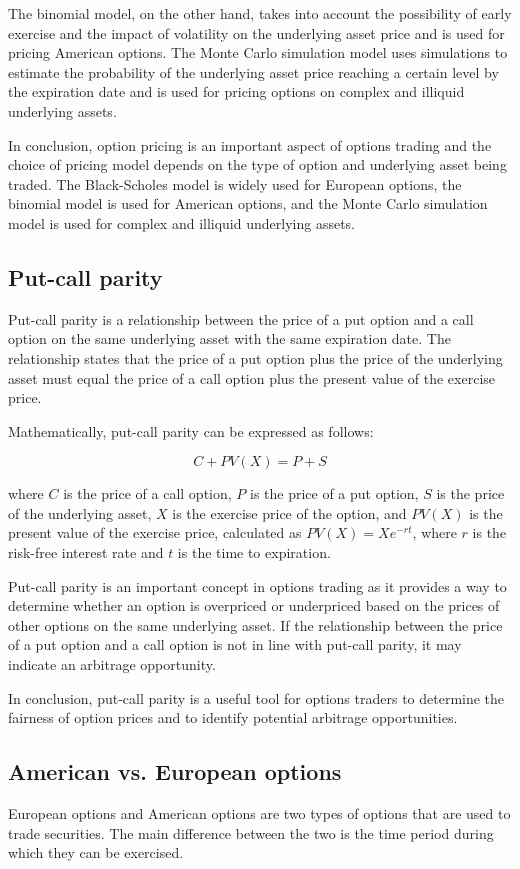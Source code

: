 \documentclass[12pt, a4paper, oneside]{article}
\begin{document}
The binomial model, on the other hand, takes into account the possibility of early exercise and the impact of volatility on the underlying asset price and is used for pricing American options. The Monte Carlo simulation model uses simulations to estimate the probability of the underlying asset price reaching a certain level by the expiration date and is used for pricing options on complex and illiquid underlying assets.

In conclusion, option pricing is an important aspect of options trading and the choice of pricing model depends on the type of option and underlying asset being traded. The Black-Scholes model is widely used for European options, the binomial model is used for American options, and the Monte Carlo simulation model is used for complex and illiquid underlying assets.
\subsection{ Put-call parity }
Put-call parity is a relationship between the price of a put option and a call option on the same underlying asset with the same expiration date. The relationship states that the price of a put option plus the price of the underlying asset must equal the price of a call option plus the present value of the exercise price.

Mathematically, put-call parity can be expressed as follows:

$$C + PV(X) = P + S$$

where $C$ is the price of a call option, $P$ is the price of a put option, $S$ is the price of the underlying asset, $X$ is the exercise price of the option, and $PV(X)$ is the present value of the exercise price, calculated as $PV(X) = Xe^{-rt}$, where $r$ is the risk-free interest rate and $t$ is the time to expiration.

Put-call parity is an important concept in options trading as it provides a way to determine whether an option is overpriced or underpriced based on the prices of other options on the same underlying asset. If the relationship between the price of a put option and a call option is not in line with put-call parity, it may indicate an arbitrage opportunity.

In conclusion, put-call parity is a useful tool for options traders to determine the fairness of option prices and to identify potential arbitrage opportunities.


\subsection{ American vs. European options }
European options and American options are two types of options that are used to trade securities. The main difference between the two is the time period during which they can be exercised.
\end{document}
